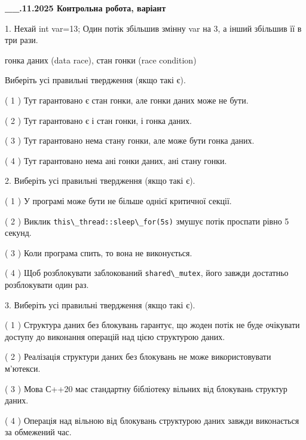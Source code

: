 \documentclass[12pt, ukrainian]{article}
\def\code#1{\Verb!#1!}
\begin{document}
\newpage
\begin {large}

\textbf{\_\_.11.2025 Контрольна робота, варіант  }\par


{
1. Нехай int var=13; Один потік збільшив змінну var на 3, а інший збільшив її в три рази.

гонка даних (data race), стан гонки (race condition)

Виберіть усі правильні твердження (якщо такі є).\par
\vspace{2mm}
( 1 ) Тут гарантовано є стан гонки, але гонки даних може не бути.%

( 2 ) Тут гарантовано є і стан гонки, і гонка даних.%

( 3 ) Тут гарантовано нема стану гонки, але може бути гонка даних.%

( 4 ) Тут гарантовано нема ані гонки даних, ані стану гонки.%


2. Виберіть усі правильні твердження (якщо такі є).\par
\vspace{2mm}

( 1 ) У програмі може бути не більше однієї критичної секції.%

( 2 ) Виклик \code{this\_thread::sleep\_for(5s)} змушує потік проспати рівно 5 секунд.%

( 3 ) Коли програма спить, то вона не виконується.%

( 4 ) Щоб розблокувати заблокований \code{shared\_mutex}, його завжди достатньо розблокувати один раз.%


3. Виберіть усі правильні твердження (якщо такі є).\par
\vspace{2mm}

( 1 ) Структура даних без блокувань гарантує, що жоден потік не буде очікувати доступу до виконання операцій над цією структурою даних.%

( 2 ) Реалізація структури даних без блокувань не може використовувати м’ютекси.%

( 3 ) Мова С++20 має стандартну бібліотеку вільних від блокувань структур даних.%

( 4 ) Операція над вільною від блокувань структурою даних завжди виконається за обмежений час.%


}
\end{large}
\end{document}
